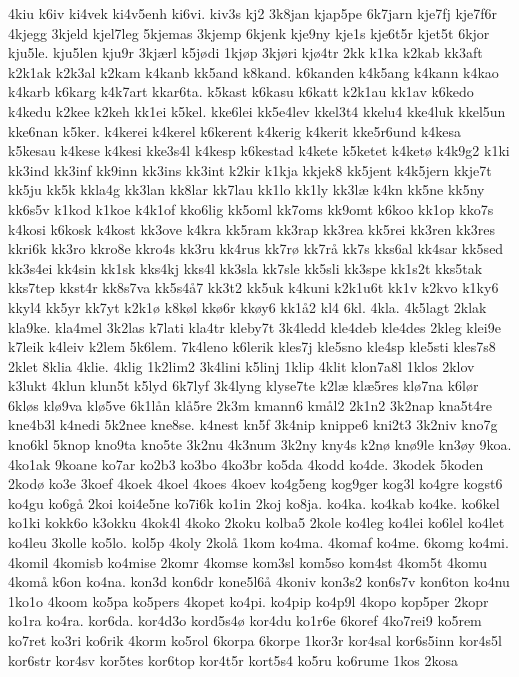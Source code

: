 {4kiu
k6iv
ki4vek
ki4v5enh
ki6vi.
kiv3s
kj2
3k8jan
kjap5pe
6k7jarn
kje7fj
kje7f6r
4kjegg
3kjeld
kjel7leg
5kjemas
3kjemp
6kjenk
kje9ny
kje1s
kje6t5r
kjet5t
6kjor
kju5le.
kju5len
kju9r
3kjærl
k5jødi
1kjøp
3kjøri
kjø4tr
2kk
k1ka
k2kab
kk3aft
k2k1ak
k2k3al
k2kam
k4kanb
kk5and
k8kand.
k6kanden
k4k5ang
k4kann
k4kao
k4karb
k6karg
k4k7art
kkar6ta.
k5kast
k6kasu
k6katt
k2k1au
kk1av
k6kedo
k4kedu
k2kee
k2keh
kk1ei
k5kel.
kke6lei
kk5e4lev
kkel3t4
kkelu4
kke4luk
kkel5un
kke6nan
k5ker.
k4kerei
k4kerel
k6kerent
k4kerig
k4kerit
kke5r6und
k4kesa
k5kesau
k4kese
k4kesi
kke3s4l
k4kesp
k6kestad
k4kete
k5ketet
k4ketø
k4k9g2
k1ki
kk3ind
kk3inf
kk9inn
kk3ins
kk3int
k2kir
k1kja
kkjek8
kk5jent
k4k5jern
kkje7t
kk5ju
kk5k
kkla4g
kk3lan
kk8lar
kk7lau
kk1lo
kk1ly
kk3læ
k4kn
kk5ne
kk5ny
kk6s5v
k1kod
k1koe
k4k1of
kko6lig
kk5oml
kk7oms
kk9omt
k6koo
kk1op
kko7s
k4kosi
k6kosk
k4kost
kk3ove
k4kra
kk5ram
kk3rap
kk3rea
kk5rei
kk3ren
kk3res
kkri6k
kk3ro
kkro8e
kkro4s
kk3ru
kk4rus
kk7rø
kk7rå
kk7s
kks6al
kk4sar
kk5sed
kk3s4ei
kk4sin
kk1sk
kks4kj
kks4l
kk3sla
kk7sle
kk5sli
kk3spe
kk1s2t
kks5tak
kks7tep
kkst4r
kk8s7va
kk5s4å7
kk3t2
kk5uk
k4kuni
k2k1u6t
kk1v
k2kvo
k1ky6
kkyl4
kk5yr
kk7yt
k2k1ø
k8køl
kkø6r
kkøy6
kk1å2
kl4
6kl.
4kla.
4k5lagt
2klak
kla9ke.
kla4mel
3k2las
k7lati
kla4tr
kleby7t
3k4ledd
kle4deb
kle4des
2kleg
klei9e
k7leik
k4leiv
k2lem
5k6lem.
7k4leno
k6lerik
kles7j
kle5sno
kle4sp
kle5sti
kles7s8
2klet
8klia
4klie.
4klig
1k2lim2
3k4lini
k5linj
1klip
4klit
klon7a8l
1klos
2klov
k3lukt
4klun
klun5t
k5lyd
6k7lyf
3k4lyng
klyse7te
k2læ
klæ5res
klø7na
k6lør
6kløs
klø9va
klø5ve
6k1lån
klå5re
2k3m
kmann6
kmål2
2k1n2
3k2nap
kna5t4re
kne4b3l
k4nedi
5k2nee
kne8se.
k4nest
kn5f
3k4nip
knippe6
kni2t3
3k2niv
kno7g
kno6kl
5knop
kno9ta
kno5te
3k2nu
4k3num
3k2ny
kny4s
k2nø
knø9le
kn3øy
9koa.
4ko1ak
9koane
ko7ar
ko2b3
ko3bo
4ko3br
ko5da
4kodd
ko4de.
3kodek
5koden
2kodø
ko3e
3koef
4koek
4koel
4koes
4koev
ko4g5eng
kog9ger
kog3l
ko4gre
kogst6
ko4gu
ko6gå
2koi
koi4e5ne
ko7i6k
ko1in
2koj
ko8ja.
ko4ka.
ko4kab
ko4ke.
ko6kel
ko1ki
kokk6o
k3okku
4kok4l
4koko
2koku
kolba5
2kole
ko4leg
ko4lei
ko6lel
ko4let
ko4leu
3kolle
ko5lo.
kol5p
4koly
2kolå
1kom
ko4ma.
4komaf
ko4me.
6komg
ko4mi.
4komil
4komisb
ko4mise
2komr
4komse
kom3sl
kom5so
kom4st
4kom5t
4komu
4komå
k6on
ko4na.
kon3d
kon6dr
kone5l6å
4koniv
kon3s2
kon6s7v
kon6ton
ko4nu
1ko1o
4koom
ko5pa
ko5pers
4kopet
ko4pi.
ko4pip
ko4p9l
4kopo
kop5per
2kopr
ko1ra
ko4ra.
kor6da.
kor4d3o
kord5s4ø
kor4du
ko1r6e
6koref
4ko7rei9
ko5rem
ko7ret
ko3ri
ko6rik
4korm
ko5rol
6korpa
6korpe
1kor3r
kor4sal
kor6s5inn
kor4s5l
kor6str
kor4sv
kor5tes
kor6top
kor4t5r
kort5s4
ko5ru
ko6rume
1kos
2kosa
}
